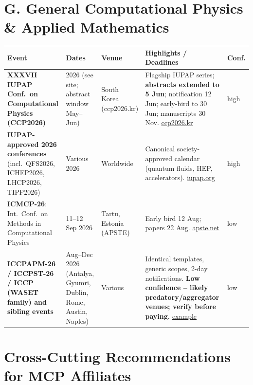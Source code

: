 \documentclass[11pt,a4paper]{article}
\begin{document}
\section{G. General Computational Physics \& Applied Mathematics}

\begin{longtable}{@{}p{3.2cm}p{3.0cm}p{2.5cm}p{5.2cm}p{1.6cm}@{}}
\toprule
\textbf{Event} & \textbf{Dates} & \textbf{Venue} & \textbf{Highlights / Deadlines} & \textbf{Conf.} \\
\midrule
\endhead
\textbf{XXXVII IUPAP Conf.\ on Computational Physics (CCP2026)}
  & 2026 (see site; abstract window May--Jun)
  & South Korea (ccp2026.kr)
  & Flagship IUPAP series; \textbf{abstracts extended to 5 Jun}; notification 12 Jun; early-bird to 30 Jun; manuscripts 30 Nov. \href{https://ccp2026.kr/index.php}{ccp2026.kr}
  & high \\
\midrule
\textbf{IUPAP-approved 2026 conferences} (incl.\ QFS2026, ICHEP2026, LHCP2026, TIPP2026)
  & Various 2026
  & Worldwide
  & Canonical society-approved calendar (quantum fluids, HEP, accelerators). \href{https://iupap.org/conferences/approved-conferences-of-the-year/}{iupap.org}
  & high \\
\midrule
\textbf{ICMCP-26}: Int.\ Conf.\ on Methods in Computational Physics
  & 11--12 Sep 2026
  & Tartu, Estonia (APSTE)
  & Early bird 12 Aug; papers 22 Aug. \href{https://apste.net/conf/about-event.php?id=101299816}{apste.net}
  & low \\
\midrule
\textbf{ICCPAPM-26 / ICCPST-26 / ICCP (WASET family) and sibling events}
  & Aug--Dec 2026 (Antalya, Gyumri, Dublin, Rome, Austin, Naples)
  & Various
  & Identical templates, generic scopes, 2-day notifications. \textbf{Low confidence -- likely predatory/aggregator venues; verify before paying.} \href{https://waset.org/computational-physics-conference-in-december-2026-in-rome}{example}
  & low \\
\bottomrule
\end{longtable}

\newpage
\section{Cross-Cutting Recommendations for MCP Affiliates}
\end{document}
